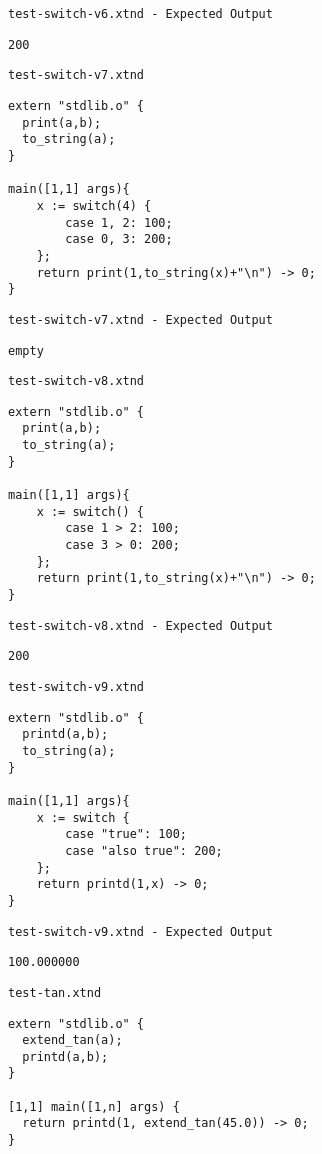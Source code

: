 \medskip \noindent \texttt{test-switch-v6.xtnd - Expected Output}


\begin{lstlisting}
200
\end{lstlisting}


\medskip \noindent \texttt{test-switch-v7.xtnd}


\begin{lstlisting}
extern "stdlib.o" {
  print(a,b);
  to_string(a);
}

main([1,1] args){
	x := switch(4) {
		case 1, 2: 100;
		case 0, 3: 200;
	};
	return print(1,to_string(x)+"\n") -> 0;
}
\end{lstlisting}


\medskip \noindent \texttt{test-switch-v7.xtnd - Expected Output}


\begin{lstlisting}
empty
\end{lstlisting}


\medskip \noindent \texttt{test-switch-v8.xtnd}


\begin{lstlisting}
extern "stdlib.o" {
  print(a,b);
  to_string(a);
}

main([1,1] args){
	x := switch() {
		case 1 > 2: 100;
		case 3 > 0: 200;
	};
	return print(1,to_string(x)+"\n") -> 0;
}
\end{lstlisting}


\medskip \noindent \texttt{test-switch-v8.xtnd - Expected Output}


\begin{lstlisting}
200
\end{lstlisting}


\medskip \noindent \texttt{test-switch-v9.xtnd}


\begin{lstlisting}
extern "stdlib.o" {
  printd(a,b);
  to_string(a);
}

main([1,1] args){
	x := switch {
		case "true": 100;
		case "also true": 200;
	};
	return printd(1,x) -> 0;
}
\end{lstlisting}


\medskip \noindent \texttt{test-switch-v9.xtnd - Expected Output}


\begin{lstlisting}
100.000000
\end{lstlisting}


\medskip \noindent \texttt{test-tan.xtnd}


\begin{lstlisting}
extern "stdlib.o" {
  extend_tan(a);
  printd(a,b);
}

[1,1] main([1,n] args) {
  return printd(1, extend_tan(45.0)) -> 0;
}
\end{lstlisting}



